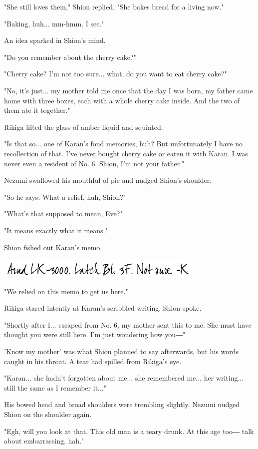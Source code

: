 "She still loves them," Shion replied. "She bakes bread for a living
now."

"Baking, huh... mm-hmm. I see."

An idea sparked in Shion's mind.

"Do you remember about the cherry cake?"

"Cherry cake? I'm not too sure... what, do you want to eat cherry cake?"

"No, it's just... my mother told me once that the day I was born, my
father came home with three boxes, each with a whole cherry cake inside.
And the two of them ate it together."

Rikiga lifted the glass of amber liquid and squinted.

"Is that so... one of Karan's fond memories, huh? But unfortunately I
have no recollection of that. I've never bought cherry cake or eaten it
with Karan. I was never even a resident of No. 6. Shion, I'm not your
father."

Nezumi swallowed his mouthful of pie and nudged Shion's shoulder.

"So he says. What a relief, huh, Shion?"

"What's that supposed to mean, Eve?"

"It means exactly what it means."

Shion fished out Karan's memo.

\includegraphics{Images/memo1.png}

"We relied on this memo to get us here."

Rikiga stared intently at Karan's scribbled writing. Shion spoke.

"Shortly after I... escaped from No. 6, my mother sent this to me. She
must have thought you were still here. I'm just wondering how you―"

'Know my mother' was what Shion planned to say afterwards, but his words
caught in his throat. A tear had spilled from Rikiga's eye.

"Karan... she hadn't forgotten about me... she remembered me... her
writing... still the same as I remember it..."

His bowed head and broad shoulders were trembling slightly. Nezumi
nudged Shion on the shoulder again.

"Egh, will you look at that. This old man is a teary drunk. At this age
too― talk about embarrassing, hah."


